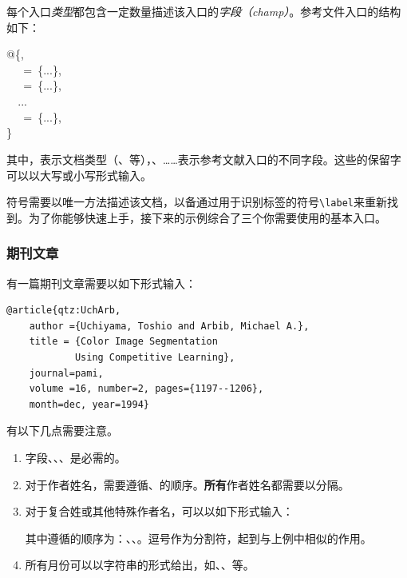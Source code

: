 每个入口\emph{类型}都包含一定数量描述该入口的\emph{字段（champ）}。参考文件入口的结构如下：

\begin{dmd}
@\{,\\
\verb|  |\ =\ \{...\},\\
\verb|  |\ =\ \{...\},\\
\verb|  |...\\
\verb|  |\ =\ \{...\},\\
\}
\end{dmd}

其中，表示文档类型（、等），、……表示参考文献入口的不同字段。这些\bib 的保留字可以以大写或小写形式输入。

符号需要以唯一方法描述该文档，以备通过用于识别标签的符号\verb|\label|来重新找到。为了你能够快速上手\bib ，接下来的示例综合了三个你需要使用的基本入口。

\subsubsection{期刊文章}

有一篇期刊文章需要以如下形式输入：

\begin{dmd}
\begin{verbatim}
@article{qtz:UchArb,
    author ={Uchiyama, Toshio and Arbib, Michael A.},
    title = {Color Image Segmentation
            Using Competitive Learning},
    journal=pami,
    volume =16, number=2, pages={1197--1206},
    month=dec, year=1994}
\end{verbatim}
\end{dmd}

有以下几点需要注意。

\begin{enumerate}
    \item 字段、、、是必需的。
    \item 对于作者姓名，需要遵循、的顺序。\textbf{所有}作者姓名都需要以分隔。
    \item 对于复合姓或其他特殊作者名，可以以如下形式输入：
    \begin{center}
    \end{center}
    其中遵循的顺序为：、、。逗号作为分割符，起到与上例中相似的作用。
    \item 所有月份可以以字符串的形式给出，如、、等。
\end{enumerate}


